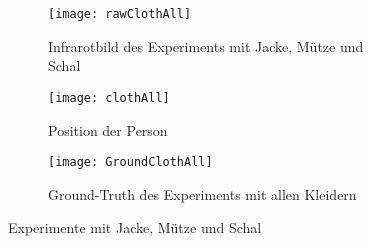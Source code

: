 \begin{figure}[H]
	\begin{subfigure}{.45\linewidth}
		\centering
		\texttt{[image: rawClothAll]}
		\caption{Infrarotbild des Experiments mit Jacke, Mütze und Schal}
		\label{fig:rawClothAll}
	\end{subfigure}\hfill%
	\begin{subfigure}{.45\linewidth}
		\centering
		\texttt{[image: clothAll]}
		\caption{Position der Person}
		\label{fig:AlgorithmsClothAll}
	\end{subfigure}\hfill%
	\begin{subfigure}{\linewidth}
		\centering
		\texttt{[image: GroundClothAll]}
		\caption{Ground-Truth des Experiments mit allen Kleidern}
		\label{fig:groundTruthClothAll}
	\end{subfigure}
	\caption{Experimente mit Jacke, Mütze und Schal}
	\label{fig:AllCloth}
\end{figure}

